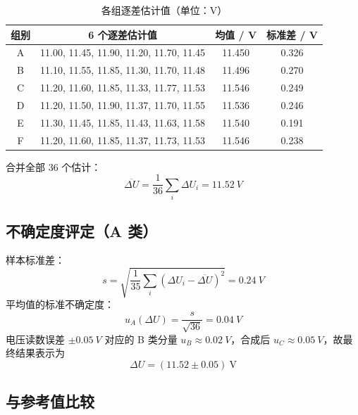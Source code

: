 \documentclass[12pt, a4paper]{ctexart}
\begin{document}
\begin{table}[htbp]
    \centering
    \caption{各组逐差估计值（单位：V）}
    \label{tab:zhucha}
    \begin{tabular}{c c cc}
        \toprule
        组别 & 6 个逐差估计值 & 均值 / V & 标准差 / V \\
        \midrule
        A & 11.00, 11.45, 11.90, 11.20, 11.70, 11.45 & 11.450 & 0.326 \\
        B & 11.10, 11.55, 11.85, 11.30, 11.70, 11.48 & 11.496 & 0.270 \\
        C & 11.20, 11.60, 11.85, 11.33, 11.77, 11.53 & 11.546 & 0.249 \\
        D & 11.20, 11.50, 11.90, 11.37, 11.70, 11.55 & 11.536 & 0.246 \\
        E & 11.30, 11.45, 11.85, 11.43, 11.63, 11.58 & 11.540 & 0.191 \\
        F & 11.20, 11.60, 11.85, 11.37, 11.73, 11.53 & 11.546 & 0.238 \\
        \bottomrule
    \end{tabular}
\end{table}

合并全部 36 个估计：
\begin{equation}
    \overline{\Delta U} = \frac{1}{36}\sum_i \Delta U_i = \SI{11.52}{V}
\end{equation}

\subsection{不确定度评定（A 类）}

样本标准差：
\begin{equation}
    s = \sqrt{\frac{1}{35}\sum_i \left(\Delta U_i - \overline{\Delta U}\right)^2} = \SI{0.24}{V}
\end{equation}
平均值的标准不确定度：
\begin{equation}
    u_A(\Delta U) = \frac{s}{\sqrt{36}} = \SI{0.04}{V}
\end{equation}
电压读数误差 $\pm\SI{0.05}{V}$ 对应的 B 类分量 $u_B \approx \SI{0.02}{V}$，合成后 $u_C \approx \SI{0.05}{V}$，故最终结果表示为
\begin{equation}
    \boxed{\Delta U = (11.52 \pm 0.05)\ \mathrm{V}}
\end{equation}

\subsection{与参考值比较}
\end{document}
